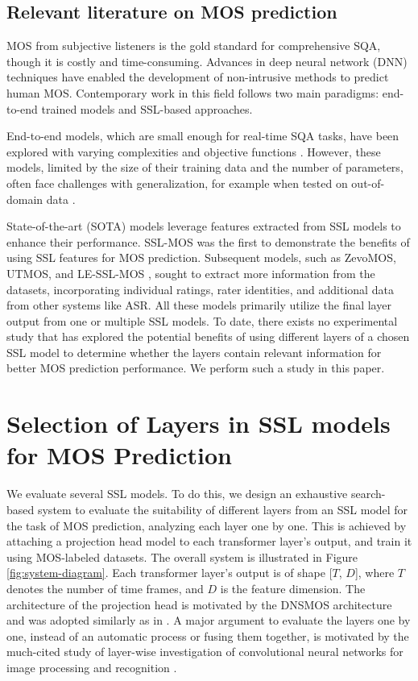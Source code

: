 \documentclass[conference]{IEEEtran}
\begin{document}
\subsection{Relevant literature on MOS prediction}

MOS from subjective listeners is the gold standard for comprehensive SQA, though it is costly and time-consuming. Advances in deep neural network (DNN) techniques have enabled the development of non-intrusive methods to predict human MOS. Contemporary work in this field follows two main paradigms: end-to-end trained models and SSL-based approaches.

End-to-end models, which are small enough for real-time SQA tasks, have been explored with varying complexities and objective functions \cite{DNSMOS, DNSMOSp, MOSNet, DeePMOS, DeePMOSb, LDNet, NISQA}. However, these models, limited by the size of their training data and the number of parameters, often face challenges with generalization, for example when tested on out-of-domain data \cite{SSL-MOS}.

State-of-the-art (SOTA) models leverage features extracted from SSL models to enhance their performance. SSL-MOS \cite{SSL-MOS} was the first to demonstrate the benefits of using SSL features for MOS prediction. Subsequent models, such as ZevoMOS, UTMOS, and LE-SSL-MOS \cite{ZevoMOS, UTMOS, LE-SSL-MOS}, sought to extract more information from the datasets, incorporating individual ratings, rater identities, and additional data from other systems like ASR. All these models primarily utilize the final layer output from one or multiple SSL models. To date, there exists no experimental study that has explored the potential benefits of using different layers of a chosen SSL model to determine whether the layers contain relevant information for better MOS prediction performance. We perform such a study in this paper.


\section{Selection of Layers in SSL models for MOS Prediction}
\label{sec:method}

We evaluate several SSL models. To do this, we design an exhaustive search-based system to evaluate the suitability of different layers from an SSL model for the task of MOS prediction, analyzing each layer one by one. This is achieved by attaching a projection head model to each transformer layer's output, and train it using MOS-labeled datasets. The overall system is illustrated in Figure \ref{fig:system-diagram}. Each transformer layer's output is of shape [$T$, $D$], where $T$ denotes the number of time frames, and $D$ is the feature dimension. The architecture of the projection head is motivated by the DNSMOS architecture \cite{DNSMOS} and was adopted similarly as in 
\cite{MultiGauss}. A major argument to evaluate the layers one by one, instead of an automatic process or fusing them together, is motivated by the much-cited study of layer-wise investigation of convolutional neural networks for image processing and recognition \cite{zeiler2014visualizing}.
\end{document}
